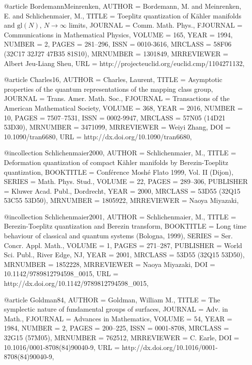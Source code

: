 @article {BordemannMeinrenken,
    AUTHOR = {Bordemann, M. and Meinrenken, E. and Schlichenmaier,
              M.},
     TITLE = {Toeplitz quantization of {K}\"ahler manifolds and {$\text{gl}(N)$}, {$N\to\infty$} limits},
   JOURNAL = {Comm. Math. Phys.},
  FJOURNAL = {Communications in Mathematical Physics},
    VOLUME = {165},
      YEAR = {1994},
    NUMBER = {2},
     PAGES = {281--296},
      ISSN = {0010-3616},
   MRCLASS = {58F06 (32C17 32J27 47B35 81S10)},
  MRNUMBER = {1301849},
MRREVIEWER = {Albert Jeu-Liang Sheu},
       URL = {http://projecteuclid.org/euclid.cmp/1104271132},
}

@article {Charles16,
    AUTHOR = {Charles, Laurent},
     TITLE = {Asymptotic properties of the quantum representations of the
              mapping class group},
   JOURNAL = {Trans. Amer. Math. Soc.},
  FJOURNAL = {Transactions of the American Mathematical Society},
    VOLUME = {368},
      YEAR = {2016},
    NUMBER = {10},
     PAGES = {7507--7531},
      ISSN = {0002-9947},
   MRCLASS = {57N05 (14D21 53D30)},
  MRNUMBER = {3471099},
MRREVIEWER = {Weiyi Zhang},
       DOI = {10.1090/tran6680},
       URL = {http://dx.doi.org/10.1090/tran6680},
}

@incollection {Schlichenmaier2000,
    AUTHOR = {Schlichenmaier, M.},
     TITLE = {Deformation quantization of compact {K}\"ahler manifolds by
              {B}erezin-{T}oeplitz quantization},
 BOOKTITLE = {Conf\'erence {M}osh\'e {F}lato 1999, {V}ol. {II} ({D}ijon)},
    SERIES = {Math. Phys. Stud.},
    VOLUME = {22},
     PAGES = {289--306},
 PUBLISHER = {Kluwer Acad. Publ., Dordrecht},
      YEAR = {2000},
   MRCLASS = {53D55 (32Q15 53C55 53D50)},
  MRNUMBER = {1805922},
MRREVIEWER = {Naoya Miyazaki},
}

@incollection {Schlichenmaier2001,
    AUTHOR = {Schlichenmaier, M.},
     TITLE = {Berezin-{T}oeplitz quantization and {B}erezin transform},
 BOOKTITLE = {Long time behaviour of classical and quantum systems
              ({B}ologna, 1999)},
    SERIES = {Ser. Concr. Appl. Math.},
    VOLUME = {1},
     PAGES = {271--287},
 PUBLISHER = {World Sci. Publ., River Edge, NJ},
      YEAR = {2001},
   MRCLASS = {53D55 (32Q15 53D50)},
  MRNUMBER = {1852228},
MRREVIEWER = {Naoya Miyazaki},
       DOI = {10.1142/9789812794598_0015},
       URL = {http://dx.doi.org/10.1142/9789812794598_0015},
}


@article {Goldman84,
    AUTHOR = {Goldman, William M.},
     TITLE = {The symplectic nature of fundamental groups of surfaces},
   JOURNAL = {Adv. in Math.},
  FJOURNAL = {Advances in Mathematics},
    VOLUME = {54},
      YEAR = {1984},
    NUMBER = {2},
     PAGES = {200--225},
      ISSN = {0001-8708},
   MRCLASS = {32G15 (57M05)},
  MRNUMBER = {762512},
MRREVIEWER = {C. Earle},
       DOI = {10.1016/0001-8708(84)90040-9},
       URL = {http://dx.doi.org/10.1016/0001-8708(84)90040-9},
}

